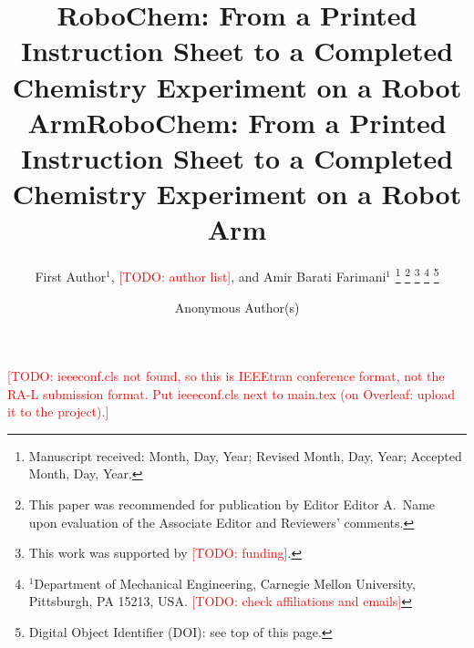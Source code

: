 \documentclass[letterpaper, 10pt, journal, twoside]{IEEEtran}}
\newcommand{\todo}[1]{\textcolor{red}{[TODO: #1]}}
\newcommand{\sysname}{RoboChem}   %
\begin{document}


\ifcameraready
\title{\sysname: From a Printed Instruction Sheet to a Completed
Chemistry Experiment on a Robot Arm}
\else
\title{\LARGE \bf \sysname: From a Printed Instruction Sheet to a Completed
Chemistry Experiment on a Robot Arm}
\fi

\ifcameraready
  \author{First Author$^{1}$, \todo{author list}, and Amir Barati Farimani$^{1}$%
  \thanks{Manuscript received: Month, Day, Year; Revised Month, Day, Year;
  Accepted Month, Day, Year.}%
  \thanks{This paper was recommended for publication by Editor
  Editor A.\ Name upon evaluation of the Associate Editor and Reviewers'
  comments.}%
  \thanks{This work was supported by \todo{funding}.}%
  \thanks{$^{1}$Department of Mechanical Engineering, Carnegie Mellon
  University, Pittsburgh, PA 15213, USA. \todo{check affiliations and emails}}%
  \thanks{Digital Object Identifier (DOI): see top of this page.}}
\else
  \author{Anonymous Author(s)}
\fi

\maketitle
\ifcameraready\else
  \thispagestyle{empty}
  \pagestyle{empty}
\fi
\ifieeeconfmissing
  \noindent\todo{ieeeconf.cls not found, so this is IEEEtran conference
  format, not the RA-L submission format. Put ieeeconf.cls next to
  main.tex (on Overleaf: upload it to the project).}
\fi
\end{document}
